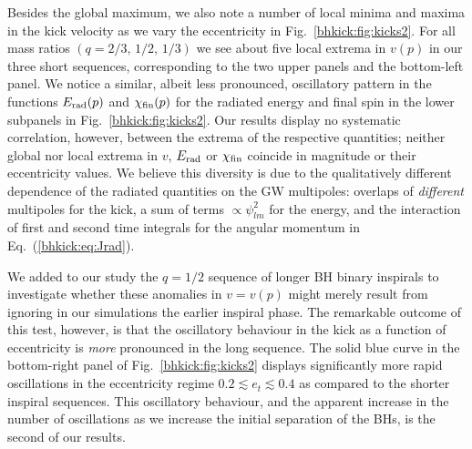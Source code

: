 Besides the global maximum, we also note a number of local minima and
maxima in the kick velocity as we vary the eccentricity in
Fig.~\ref{bhkick:fig:kicks2}. For all mass ratios $(q=2/3,\,1/2,\,1/3)$ we
see about five
local extrema in $v(p)$ in our three short sequences,
corresponding to the two upper panels and the bottom-left panel.
We notice a similar, albeit less pronounced,
oscillatory pattern in the functions
$E_{\rm rad}(p)$ and $\chi_{\rm fin}(p)$ for the radiated
energy and final spin in the lower subpanels in
Fig.~\ref{bhkick:fig:kicks2}. Our results display no systematic
correlation, however, between the extrema of the respective
quantities; neither global nor local extrema in $v$,
$E_{\rm rad}$ or $\chi_{\rm fin}$ coincide in
magnitude or their eccentricity values.
We believe this diversity is due to the qualitatively
different dependence of the radiated quantities on the
GW multipoles: overlaps of {\it different} multipoles for the
kick, a sum of terms $\propto \psi_{lm}^2$ for the energy,
and the interaction of first and second time integrals
for the angular momentum in Eq.~(\ref{bhkick:eq:Jrad}).

We added
to our study the $q = 1/2$ sequence of longer BH binary inspirals to
investigate whether these anomalies in $v=v(p)$ might merely result
from ignoring in our simulations the earlier inspiral phase. The
remarkable outcome of this test, however, is that the oscillatory
behaviour in the kick as a function of eccentricity is \emph{more}
pronounced in the long sequence.  The solid blue curve in the
bottom-right panel of Fig.~\ref{bhkick:fig:kicks2} displays significantly more
rapid oscillations in the eccentricity regime
$0.2\lesssim e_t \lesssim 0.4$ as compared to the shorter inspiral
sequences.  This oscillatory behaviour, and the apparent increase in
the number of oscillations as we increase the initial separation of
the BHs, is the second of our results.

